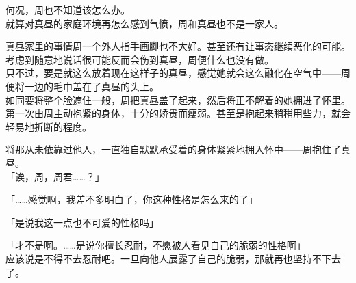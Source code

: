 何况，周也不知道该怎么办。\\

就算对真昼的家庭环境再怎么感到气愤，周和真昼也不是一家人。

真昼家里的事情周一个外人指手画脚也不大好。甚至还有让事态继续恶化的可能。考虑到随意地说话很可能反而会伤到真昼，周便什么也没有做。\\

只不过，要是就这么放着现在这样子的真昼，感觉她就会这么融化在空气中——周便将一边的毛巾盖在了真昼的头上。\\

如同要将整个脸遮住一般，周把真昼盖了起来，然后将正不解着的她拥进了怀里。\\

第一次由周主动抱紧的身体，十分的娇贵而瘦弱。甚至是抱起来稍稍用些力，就会轻易地折断的程度。

将那从未依靠过他人，一直独自默默承受着的身体紧紧地拥入怀中——周抱住了真昼。\\

「诶，周，周君……？」

「……感觉啊，我差不多明白了，你这种性格是怎么来的了」

「是说我这一点也不可爱的性格吗」

「才不是啊。……是说你擅长忍耐，不愿被人看见自己的脆弱的性格啊」\\

应该说是不得不去忍耐吧。一旦向他人展露了自己的脆弱，那就再也坚持不下去了。\\

